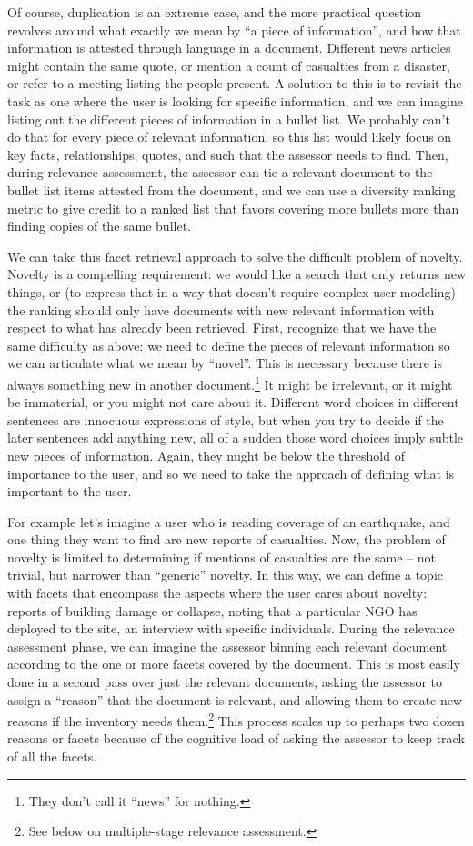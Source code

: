 \documentclass[nobib]{tufte-book}
\begin{document}
Of course, duplication is an extreme case, and the more practical question revolves around what exactly we mean by ``a piece of information'', and how that information is attested through language in a document.  Different news articles might contain the same quote, or mention a count of casualties from a disaster, or refer to a meeting listing the people present.  A solution to this is to revisit the task as one where the user is looking for specific information, and we can imagine listing out the different pieces of information in a bullet list.  We probably can't do that for every piece of relevant information, so this list would likely focus on key facts, relationships, quotes, and such that the assessor needs to find.  Then, during relevance assessment, the assessor can tie a relevant document to the bullet list items attested from the document, and we can use a diversity ranking metric to give credit to a ranked list that favors covering more bullets more than finding copies of the same bullet.

We can take this facet retrieval approach to solve the difficult problem of novelty.  Novelty is a compelling requirement: we would like a search that only returns new things, or (to express that in a way that doesn't require complex user modeling) the ranking should only have documents with new relevant information with respect to what has already been retrieved.  First, recognize that we have the same difficulty as above: we need to define the pieces of relevant information so we can articulate what we mean by ``novel''.  This is necessary because there is always something new in another document.\footnote{They don't call it ``news'' for nothing.}  It might be irrelevant, or it might be immaterial, or you might not care about it.  Different word choices in different sentences are innocuous expressions of style, but when you try to decide if the later sentences add anything new, all of a sudden those word choices imply subtle new pieces of information.  Again, they might be below the threshold of importance to the user, and so we need to take the approach of defining what is important to the user.  

For example let's imagine a user who is reading coverage of an earthquake, and one thing they want to find are new reports of casualties.  Now, the problem of novelty is limited to determining if mentions of casualties are the same -- not trivial, but narrower than ``generic'' novelty.  In this way, we can define a topic with facets that encompass the aspects where the user cares about novelty: reports of building damage or collapse, noting that a particular NGO has deployed to the site, an interview with specific individuals.  During the relevance assessment phase, we can imagine the assessor binning each relevant document according to the one or more facets covered by the document.  This is most easily done in a second pass over just the relevant documents, asking the assessor to assign a ``reason'' that the document is relevant, and allowing them to create new reasons if the inventory needs them.\footnote{See below on multiple-stage relevance assessment.}  This process scales up to perhaps two dozen reasons or facets because of the cognitive load of asking the assessor to keep track of all the facets.
\end{document}

